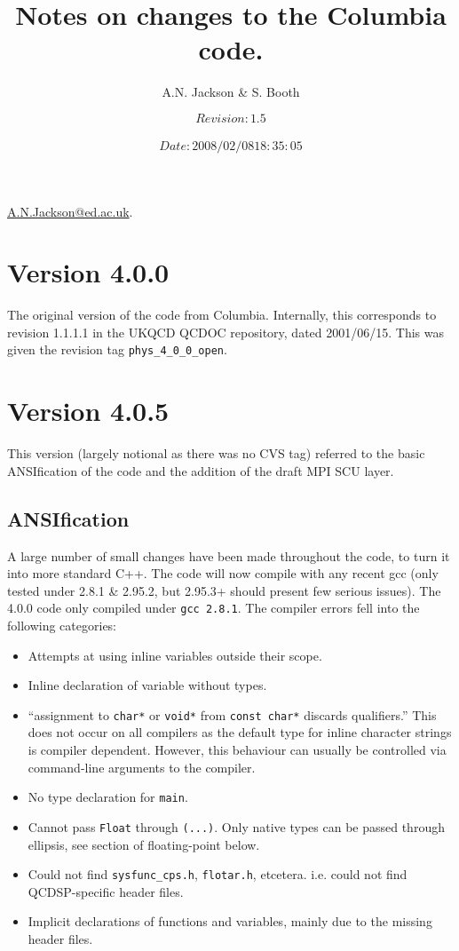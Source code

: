 \documentclass[12pt]{article}
\title{Notes on changes to the Columbia code.}
\author{A.N. Jackson \& S. Booth}
\date{\mbox{\small $$Revision: 1.5 $$  $$Date: 2008/02/08 18:35:05 $$}}
\newcommand{\cde}[1]{{\tt #1}}            %
\begin{document}
\maketitle

\begin{flushright}
\href{mailto:A.N.Jackson@ed.ac.uk}{A.N.Jackson@ed.ac.uk}.
\end{flushright}

\tableofcontents

\newpage

\section{Version 4.0.0}
The original version of the code from Columbia.  Internally, this corresponds
to revision 1.1.1.1 in the UKQCD QCDOC repository, dated 2001/06/15.  
This was given the revision tag \cde{phys\_4\_0\_0\_open}. 

\section{Version 4.0.5}
This version (largely notional as there was no CVS tag) referred to the basic
ANSIfication of the code and the addition of the draft MPI SCU layer.

\subsection{ANSIfication}
\label{405ANSI}
A large number of small changes have been made throughout the code, to
turn it into more standard C++.  The code will now compile with any recent gcc
(only tested under 2.8.1 \& 2.95.2, but 2.95.3+ should present few serious
issues).  The 4.0.0 code only compiled under \cde{gcc 2.8.1}.  The compiler errors
fell into the following categories:
\begin{itemize}
 \item Attempts at using inline variables outside their scope.
 \item Inline declaration of variable without types.  
 \item ``assignment to \cde{char*} or \cde{void*} from \cde{const char*}
 discards qualifiers.''  This does not occur on all compilers as the default
 type for inline character strings is compiler dependent.  However, this behaviour 
 can usually be controlled via command-line arguments to the compiler.
 \item No type declaration for \cde{main}.
 \item Cannot pass \cde{Float} through \cde{(...)}.  Only native types can be
 passed through ellipsis, see section of floating-point below.
 \item Could not find \cde{sysfunc_cps.h}, \cde{flotar.h},
 etcetera. i.e. could not find QCDSP-specific header files.
 \item Implicit declarations of functions and variables, mainly due
 to the missing header files.
\end{itemize}
\end{document}

